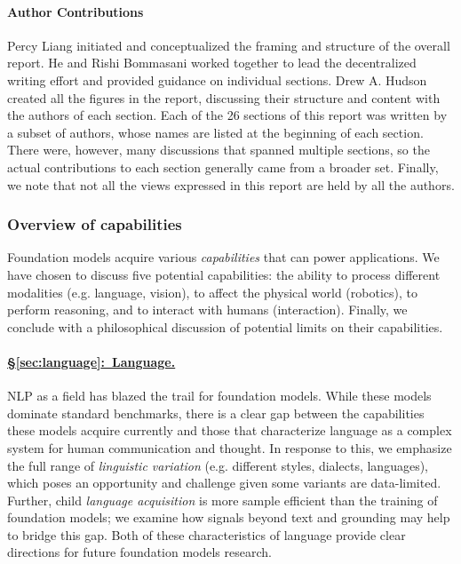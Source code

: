 \paragraph{Author Contributions} Percy Liang initiated and conceptualized the framing and structure of the overall report. He and Rishi Bommasani worked together to lead the decentralized writing effort and provided guidance on individual sections. Drew A. Hudson created all the figures in the report, discussing their structure and content with the authors of each section. Each of the 26 sections of this report was written by a subset of authors, whose names are listed at the beginning of each section. There were, however, many discussions that spanned multiple sections, so the actual contributions to each section generally came from a broader set. Finally, we note that not all the views expressed in this report are held by all the authors.

\newcommand*{\rev}{\textcolor{blue}}

\subsubsection{Overview of capabilities}
\label{sec:overview-capabilities}

Foundation models acquire various \emph{capabilities} that can power applications. We have chosen to discuss five potential capabilities: the ability to process different modalities (e.g. language, vision), to affect the physical world (robotics), to perform reasoning, and to interact with humans (interaction).  Finally, we conclude with a philosophical discussion of potential limits on their capabilities.

\paragraph{\hyperref[sec:language]{§\ref{sec:language}:~Language.}}

NLP as a field has blazed the trail for foundation models. While these models dominate standard benchmarks, there is a clear gap between the capabilities these models acquire currently and those that characterize language as a complex system for human communication and thought. In response to this, we emphasize the full range of \textit{linguistic variation} (e.g. different styles, dialects, languages), which poses an opportunity and challenge given some variants are data-limited. Further, child \textit{language acquisition} is more sample efficient than the training of foundation models; we examine how signals beyond text and grounding may help to bridge this gap. Both of these characteristics of language provide clear directions for future foundation models research.

